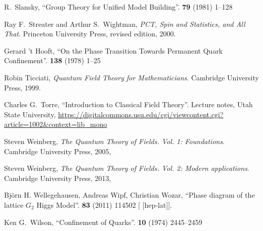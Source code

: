 \begin{thebibliography}{99}
R.~Slansky,
``Group Theory for Unified Model Building''.
 \textbf{79} (1981) 1--128
{\tt{}}

Ray F.~Streater and Arthur S.~Wightman,
\textit{PCT, Spin and Statistics, and All That}.
Princeton University Press, revised edition, 2000.

Gerard 't Hooft,
``On the Phase Transition Towards Permanent Quark Confinement''.
 \textbf{138} (1978) 1--25
{\tt{}}

Robin Ticciati,
\textit{Quantum Field Theory for Mathematicians}.
Cambridge University Press, 1999.

Charles G.~Torre,
``Introduction to Classical Field Theory''.
Lecture notes, Utah State University,
\url{https://digitalcommons.usu.edu/cgi/viewcontent.cgi?article=1002&context=lib_mono}

Steven Weinberg,
\textit{The Quantum Theory of Fields. Vol. 1: Foundations}.
Cambridge University Press, 2005,
{\tt{}}

Steven Weinberg,
\textit{The Quantum Theory of Fields. Vol. 2: Modern applications}.
Cambridge University Press, 2013,
{\tt{}}

Bj\"{o}rn H. Wellegehausen, Andreas Wipf, Christian Wozar,
``Phase diagram of the lattice $G_2$ Higgs Model''.
 \textbf{83} (2011) 114502
{\tt{}}
[ [hep-lat]].

Ken G.~Wilson,
``Confinement of Quarks''.
 \textbf{10} (1974) 2445--2459
{\tt{}}

\end{thebibliography}

